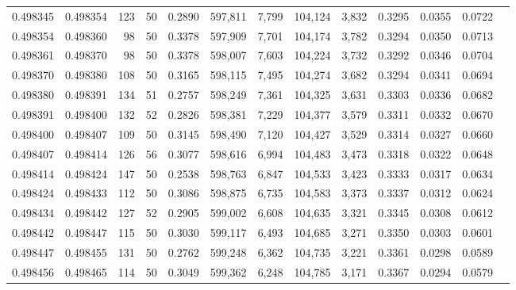 \begin{tabular}{rrrrrrrrrrrrr}
0.498345 & 0.498354 &   123 &  50 &                                     0.2890 & 597,811 &   7,799 & 104,124 &   3,832 & 0.3295 & 0.0355 & 0.0722 \\
0.498354 & 0.498360 &    98 &  50 &                                     0.3378 & 597,909 &   7,701 & 104,174 &   3,782 & 0.3294 & 0.0350 & 0.0713 \\
0.498361 & 0.498370 &    98 &  50 &                                     0.3378 & 598,007 &   7,603 & 104,224 &   3,732 & 0.3292 & 0.0346 & 0.0704 \\
0.498370 & 0.498380 &   108 &  50 &                                     0.3165 & 598,115 &   7,495 & 104,274 &   3,682 & 0.3294 & 0.0341 & 0.0694 \\
0.498380 & 0.498391 &   134 &  51 &                                     0.2757 & 598,249 &   7,361 & 104,325 &   3,631 & 0.3303 & 0.0336 & 0.0682 \\
0.498391 & 0.498400 &   132 &  52 &                                     0.2826 & 598,381 &   7,229 & 104,377 &   3,579 & 0.3311 & 0.0332 & 0.0670 \\
0.498400 & 0.498407 &   109 &  50 &                                     0.3145 & 598,490 &   7,120 & 104,427 &   3,529 & 0.3314 & 0.0327 & 0.0660 \\
0.498407 & 0.498414 &   126 &  56 &                                     0.3077 & 598,616 &   6,994 & 104,483 &   3,473 & 0.3318 & 0.0322 & 0.0648 \\
0.498414 & 0.498424 &   147 &  50 &                                     0.2538 & 598,763 &   6,847 & 104,533 &   3,423 & 0.3333 & 0.0317 & 0.0634 \\
0.498424 & 0.498433 &   112 &  50 &                                     0.3086 & 598,875 &   6,735 & 104,583 &   3,373 & 0.3337 & 0.0312 & 0.0624 \\
0.498434 & 0.498442 &   127 &  52 &                                     0.2905 & 599,002 &   6,608 & 104,635 &   3,321 & 0.3345 & 0.0308 & 0.0612 \\
0.498442 & 0.498447 &   115 &  50 &                                     0.3030 & 599,117 &   6,493 & 104,685 &   3,271 & 0.3350 & 0.0303 & 0.0601 \\
0.498447 & 0.498455 &   131 &  50 &                                     0.2762 & 599,248 &   6,362 & 104,735 &   3,221 & 0.3361 & 0.0298 & 0.0589 \\
0.498456 & 0.498465 &   114 &  50 &                                     0.3049 & 599,362 &   6,248 & 104,785 &   3,171 & 0.3367 & 0.0294 & 0.0579 \\

\end{tabular}
